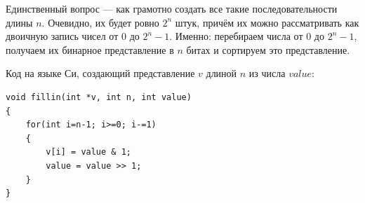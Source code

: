 \documentclass[14pt]{extarticle}
\begin{document}
Единственный вопрос --- как грамотно создать все такие последовательности длины $n$. Очевидно, их будет ровно $2^n$ штук, причём их можно рассматривать как двоичную запись чисел от $0$ до $2^n-1$. Именно: перебираем числа от $0$ до $2^n-1$, получаем их бинарное представление в $n$ битах и сортируем это представление.

Код на языке Си, создающий представление $v$ длиной $n$ из числа $value$:
\begin{lstlisting}
void fillin(int *v, int n, int value)
{
    for(int i=n-1; i>=0; i-=1)
    {
        v[i] = value & 1;
        value = value >> 1;
    }
}
\end{lstlisting}
\end{document}
